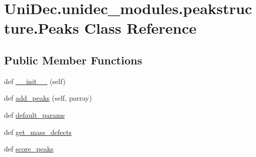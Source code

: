 \hypertarget{class_uni_dec_1_1unidec__modules_1_1peakstructure_1_1_peaks}{}\section{Uni\+Dec.\+unidec\+\_\+modules.\+peakstructure.\+Peaks Class Reference}
\label{class_uni_dec_1_1unidec__modules_1_1peakstructure_1_1_peaks}
\subsection*{Public Member Functions}
\begin{DoxyCompactItemize}
\item 
def \hyperlink{class_uni_dec_1_1unidec__modules_1_1peakstructure_1_1_peaks_a60f2e6944b150cc4c7aaa8cb53a027d3}{\+\_\+\+\_\+init\+\_\+\+\_\+} (self)
\item 
def \hyperlink{class_uni_dec_1_1unidec__modules_1_1peakstructure_1_1_peaks_a0e79f7becebb5e50d375b80026005aa7}{add\+\_\+peaks} (self, parray)
\item 
def \hyperlink{class_uni_dec_1_1unidec__modules_1_1peakstructure_1_1_peaks_a99f937dc2c05f05b9b3db76dfc383b34}{default\+\_\+params}
\item 
def \hyperlink{class_uni_dec_1_1unidec__modules_1_1peakstructure_1_1_peaks_ad37c3cd96a800b1d09f6664ab160d957}{get\+\_\+mass\+\_\+defects}
\item 
def \hyperlink{class_uni_dec_1_1unidec__modules_1_1peakstructure_1_1_peaks_ad8e3f54d010f86ce704160c754450703}{score\+\_\+peaks}
\end{DoxyCompactItemize}
